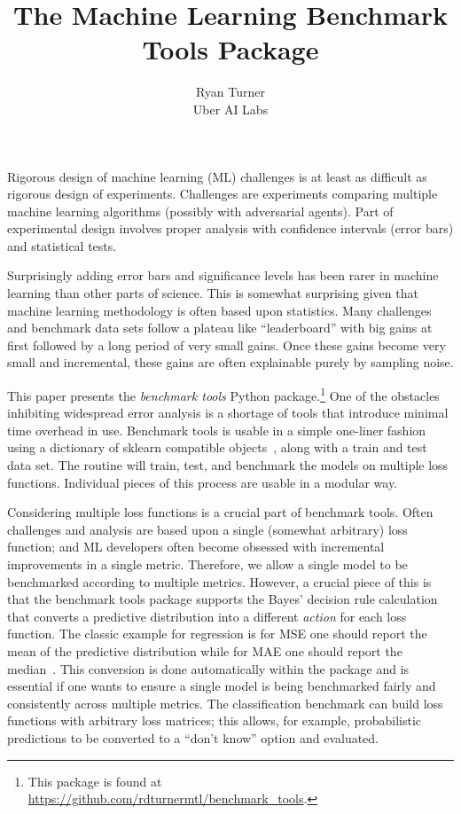\documentclass{article}
\title{The Machine Learning Benchmark Tools Package}
\author{
  Ryan Turner \\
  Uber AI Labs
}
\begin{document}

\maketitle

Rigorous design of machine learning (ML) challenges is at least as difficult as rigorous design of experiments.
Challenges are experiments comparing multiple machine learning algorithms (possibly with adversarial agents)\@.
Part of experimental design involves proper analysis with confidence intervals (error bars) and statistical tests.

Surprisingly adding error bars and significance levels has been rarer in machine learning than other parts of science.
This is somewhat surprising given that machine learning methodology is often based upon statistics.
Many challenges and benchmark data sets follow a plateau like ``leaderboard'' with big gains at first followed by a long period of very small gains.
Once these gains become very small and incremental, these gains are often explainable purely by sampling noise.

This paper presents the \emph{benchmark tools} Python package.\footnote{This package is found at
\url{https://github.com/rdturnermtl/benchmark_tools}.}
One of the obstacles inhibiting widespread error analysis is a shortage of tools that introduce minimal time overhead in use.
Benchmark tools is usable in a simple one-liner fashion using a dictionary of sklearn compatible objects~\citep{Pedregosa2011}, along with a train and test data set.
The routine will train, test, and benchmark the models on multiple loss functions.
Individual pieces of this process are usable in a modular way.

Considering multiple loss functions is a crucial part of benchmark tools.
Often challenges and analysis are based upon a single (somewhat arbitrary) loss function; and ML developers often become obsessed with incremental improvements in a single metric.
Therefore, we allow a single model to be benchmarked according to multiple metrics.
However, a crucial piece of this is that the benchmark tools package supports the Bayes' decision rule calculation that converts a predictive distribution into a different \emph{action} for each loss function.
The classic example for regression is for MSE one should report the mean of the predictive distribution while for MAE one should report the median~\citep{Marchini2013}.
This conversion is done automatically within the package and is essential if one wants to ensure a single model is being benchmarked fairly and consistently across multiple metrics.
The classification benchmark can build loss functions with arbitrary loss matrices; this allows, for example, probabilistic predictions to be converted to a ``don't know'' option and evaluated.
\end{document}
